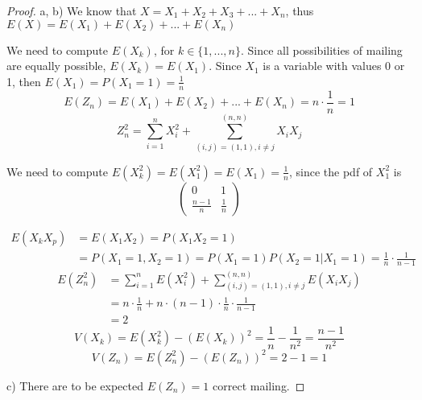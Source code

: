 \documentclass{article}
\begin{document}
\begin{proof}
a, b) We know that $X = X_1 + X_2 + X_3 + ... + X_n$, thus $E(X) = E(X_1) + E(X_2) + ... + E(X_n)$

We need to compute $E(X_k)$, for $k \in \{1, . . . , n\}.$ Since all possibilities of mailing are equally possible, $E(X_k) = E(X_1).$
Since $X_1$ is a variable with values 0 or 1, then $E(X_1) = P(X_1 = 1) = \frac{1}{n}$
\[
    E(Z_n) = E(X_1) + E(X_2) + ... + E(X_n) = n \cdot \frac{1}{n} = 1
\]
 \[ Z_n^2 = \sum_{i=1}^{n}{X_i^2} + \sum_{(i,j) = (1, 1), i \neq j}^{(n, n)}{X_i X_j}\]


We need to compute $E(X_k^2) = E(X_1^2) = E(X_1) = \frac{1}{n}$, since the pdf of $X_1^2$ is 
\begin{equation*}
    \begin{pmatrix}
    0 & 1 \\
    \frac{n - 1}{n} & \frac{1}{n}
    \end{pmatrix}
\end{equation*}

\begin{equation*}
    \begin{split}
    E(X_k X_p) &= E(X_1 X_2) = P(X_1 X_2 = 1) \\ &= P(X_1 = 1, X_2 = 1) = P(X_1 = 1) P(X_2 = 1 | X_1 = 1) = \frac{1}{n} \cdot \frac{1}{n - 1}
    \end{split}
\end{equation*}
\begin{equation*}
\begin{split}
     E(Z_n^2) &= \sum_{i=1}^{n}{E(X_i^2)} + \sum_{(i,j) = (1, 1), i \neq j}^{(n, n)}{E(X_i X_j)} \\
     &= n \cdot \frac{1}{n} + n\cdot (n - 1) \cdot \frac{1}{n} \cdot \frac{1}{n - 1} \\
     &= 2
\end{split}
   
\end{equation*}
\begin{equation*}
    V(X_k) = E(X_k^2) - (E(X_k))^2 = \frac{1}{n} - \frac{1}{n^2} = \frac{n - 1}{n^2}
\end{equation*}
\begin{equation*}
    V(Z_n) = E(Z_n^2) - (E(Z_n))^2 = 2 - 1 = 1
\end{equation*}

c) There are to be expected $E(Z_n) = 1$ correct mailing.
\end{proof}
\end{document}
